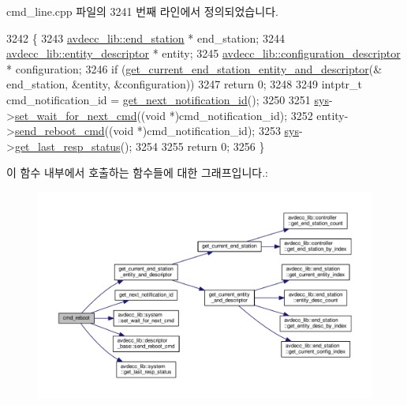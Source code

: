 cmd\+\_\+line.\+cpp 파일의 3241 번째 라인에서 정의되었습니다.


\begin{DoxyCode}
3242 \{
3243     \hyperlink{classavdecc__lib_1_1end__station}{avdecc\_lib::end\_station} * end\_station;
3244     \hyperlink{classavdecc__lib_1_1entity__descriptor}{avdecc\_lib::entity\_descriptor} * entity;
3245     \hyperlink{classavdecc__lib_1_1configuration__descriptor}{avdecc\_lib::configuration\_descriptor} * configuration;
3246     \textcolor{keywordflow}{if} (\hyperlink{classcmd__line_ac2d4611fba7db03d436a2e3c1e64828e}{get\_current\_end\_station\_entity\_and\_descriptor}(&
      end\_station, &entity, &configuration))
3247         \textcolor{keywordflow}{return} 0;
3248 
3249     intptr\_t cmd\_notification\_id = \hyperlink{classcmd__line_a57486218387d1aa9d262eb7c176154ad}{get\_next\_notification\_id}();
3250 
3251     \hyperlink{classcmd__line_a485db4800e331cb4052c447fdf5d154e}{sys}->\hyperlink{classavdecc__lib_1_1system_a26b769584f10225077da47583edda33e}{set\_wait\_for\_next\_cmd}((\textcolor{keywordtype}{void} *)cmd\_notification\_id);
3252     entity->\hyperlink{classavdecc__lib_1_1descriptor__base_a1618412a9b3d57a12044030b31cfd5a3}{send\_reboot\_cmd}((\textcolor{keywordtype}{void} *)cmd\_notification\_id);
3253     \hyperlink{classcmd__line_a485db4800e331cb4052c447fdf5d154e}{sys}->\hyperlink{classavdecc__lib_1_1system_aa63e8d1a4e51f695cdcccc9340922407}{get\_last\_resp\_status}();
3254 
3255     \textcolor{keywordflow}{return} 0;
3256 \}
\end{DoxyCode}


이 함수 내부에서 호출하는 함수들에 대한 그래프입니다.\+:
\nopagebreak
\begin{figure}[H]
\begin{center}
\leavevmode
\includegraphics[width=350pt]{classcmd__line_a507353a665b5d1b1ea291ae5dcc7f8a0_cgraph}
\end{center}
\end{figure}





